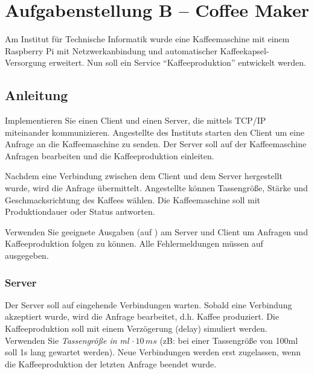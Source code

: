 

\usepackage{bytefield}

\newcommand{\baselinecenterit}[1]{%
  \centering
  \raisebox{0pt}[\heightof{W}][0pt]{\itshape #1}%
}



\section*{Aufgabenstellung B -- Coffee Maker}\label{sec:aufgabenstellung}

Am Institut für Technische Informatik wurde eine Kaffeemaschine mit einem
Raspberry Pi mit Netzwerkanbindung und automatischer Kaffeekapsel-Versorgung
erweitert. Nun soll ein Service ``Kaffeeproduktion'' entwickelt werden.

\subsection*{Anleitung}
Implementieren Sie einen Client und einen Server, die mittels TCP/IP
miteinander kommunizieren. Angestellte des Instituts starten den Client um eine
Anfrage an die Kaffeemaschine zu senden. Der Server soll auf der Kaffeemaschine
Anfragen bearbeiten und die Kaffeeproduktion einleiten.

Nachdem eine Verbindung zwischen dem Client und dem Server hergestellt wurde,
wird die Anfrage übermittelt. Angestellte können Tassengröße, Stärke und
Geschmacksrichtung des Kaffees wählen. Die Kaffeemaschine soll mit
Produktiondauer oder Status antworten.

Verwenden Sie geeignete Ausgaben (auf ) am Server und Client
um Anfragen und Kaffeeproduktion folgen zu können. Alle Fehlermeldungen müssen
auf  ausgegeben.

\subsubsection*{Server}
Der Server soll auf eingehende Verbindungen warten. Sobald eine Verbindung
akzeptiert wurde, wird die Anfrage bearbeitet, d.h. Kaffee produziert. Die
Kaffeeproduktion soll mit einem Verzögerung (delay) simuliert werden. Verwenden
Sie \emph{Tassengröße in ml} $\cdot \, 10 \, ms$ (zB: bei einer Tassengröße von 100ml
soll 1s lang gewartet werden). Neue Verbindungen werden erst zugelassen, wenn
die Kaffeeproduktion der letzten Anfrage beendet wurde.

